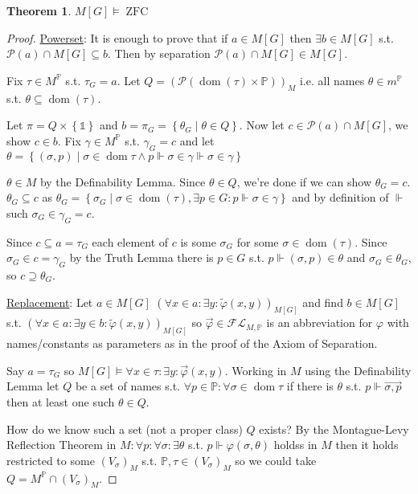 \documentclass{scrartcl}
\renewcommand{\P}{\mathcal{P}}
\newcommand{\set}[1]{\left\{#1\right\}}
\DeclareMathOperator{\ZFC}{ZFC}
\DeclareMathOperator{\dom}{dom}
\theoremstyle{definition}
\theoremstyle{plain}
\newtheorem*{theorem*}{Theorem}
\theoremstyle{remark}
\begin{document}
	\begin{theorem*}
		$M[G] \vDash \ZFC$
	\end{theorem*}

	\begin{proof}
		\underline{Powerset}: It is enough to prove that if $a \in M[G]$ then
		$\exists b \in M[G]$ s.t. $\P(a) \cap M[G] \subseteq b$. Then by separation
		$\P(a) \cap M[G] \in M[G]$. 

		Fix $\tau \in M^\mathbb{P}$ s.t. $\tau_G = a$. Let $Q = (\P(\dom(\tau) \times 
		\mathbb{P}))_M$ i.e. all names $\theta \in m^\mathbb{P}$ s.t. $\theta \subseteq
		\dom(\tau)$.

		Let $\pi = Q \times \set{\mathbb{1}}$ and $b = \pi_G = \set{\theta_G \mid \theta
		\in Q}$. Now let $c \in \P(a) \cap M[G]$, we show $c \in b$. Fix $\gamma \in
		M^\mathbb{P}$ s.t. $\gamma_G = c$ and let $\theta = \set{(\sigma, p) \mid
		\sigma \in \dom{\tau} \land p \Vdash \sigma \in \gamma \Vdash \sigma \in \gamma}$
		
		$\theta \in M$ by the Definability Lemma. Since $\theta \in Q$, we're
		done if we can show $\theta_G = c$. $\theta_G \subseteq c$ as $\theta_G
		= \set{\sigma_G \mid \sigma \in \dom(\tau), \exists p \in G: p \Vdash \sigma \in
		\gamma}$ and by definition of $\Vdash$ such $\sigma_G \in \gamma_G = c$.
		
		Since $c \subseteq a = \tau_G$ each element of $c$ is some $\sigma_G$ for
		some $\sigma \in \dom(\tau)$. Since $\sigma_G \in c = \gamma_G$ by the
		Truth Lemma there is $p \in G$ s.t. $p \Vdash (\sigma, p) \in \theta$ 
		and $\sigma_G \in \theta_G$, so $c \supseteq \theta_G$.

		\underline{Replacement}: Let $a \in M[G]$ $(\forall x \in a: \exists y: \tilde{\varphi}(x, y))_{M[G]}$
		and find $b \in M[G]$ s.t. $(\forall x \in a: \exists y \in b: \tilde{\varphi}(x,y))_{M[G]}$
		so $\vec{\varphi} \in \mathcal{FL}_{M, \mathbb{P}}$ is an abbreviation for
		$\varphi$ with names/constants as parameters as in the proof of the 
		Axiom of Separation.

		Say $a = \tau_G$ so $M[G] \vDash \forall x \in \tau: \exists y: \vec{\varphi}(x,y)$.
		Working in $M$ using the Definability Lemma let $Q$ be a set of names s.t.
		$\forall p \in \mathbb{P}: \forall \sigma \in \dom{\tau}$ if there is 
		$\theta$ s.t. $p \Vdash \vec{\sigma, p}$ then at least one such $\theta \in Q$.

		How do we know such a set (not a proper class) $Q$ exists? By the Montague-Levy
		Reflection Theorem in $M: \forall p: \forall \sigma: \exists \theta$ s.t.
		$p \Vdash \varphi(\sigma, \theta)$ holdss in $M$ then it holds
		restricted to some $(V_\sigma)_M$ s.t. $\mathbb{P}, \tau \in (V_\sigma)_M$
		so we could take $Q = M^\mathbb{P} \cap (V_\sigma)_M$. 


\end{proof}
\end{document}
